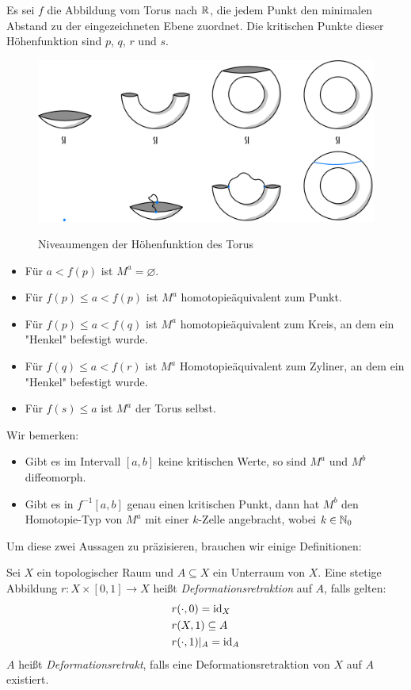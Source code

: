 Es sei $f$ die Abbildung vom Torus nach ${ \mathbb R }$, die jedem Punkt den minimalen
Abstand zu der eingezeichneten Ebene zuordnet. 
Die kritischen Punkte dieser Höhenfunktion sind $p$, $q$, $r$ und $s$.

\begin{figure}[H]
    \centering
    \includegraphics[width=0.8\linewidth]{resources/Me-Diagram3-torus-example.jpeg}
    \label{fig:me-diagram3}
    \caption{Niveaumengen der Höhenfunktion des Torus}
\end{figure}

\begin{itemize}
    \item Für $a < f(p)$ ist $M^a = \varnothing$.
    \item Für $f(p) \leq a < f(p)$ ist $M^a$ homotopieäquivalent zum Punkt.
    \item Für $f(p) \leq a < f(q)$ ist $M^a$ homotopieäquivalent zum Kreis,
        an dem ein "Henkel" befestigt wurde.
    \item Für $f(q) \leq a < f(r)$ ist $M^a$ Homotopieäquivalent zum Zyliner,
        an dem ein "Henkel" befestigt wurde.
    \item Für $f(s) \leq a$ ist $M^a$ der Torus selbst.
\end{itemize}

Wir bemerken: 
\begin{itemize}
    \item Gibt es im Intervall $[a, b]$ keine kritischen Werte, so sind $M^a$ und
        $M^b$ diffeomorph.
    \item Gibt es in $f^{-1}[a, b]$ genau einen kritischen Punkt, dann hat $M^b$ 
        den Homotopie-Typ von $M^a$ mit einer $k$-Zelle angebracht, wobei 
        $k \in { \mathbb N }_0$
\end{itemize}

Um diese zwei Aussagen zu präzisieren, brauchen wir einige Definitionen:

\begin{definition}[Deformationsretrakt]
    Sei $X$ ein topologischer Raum und $A \subseteq X$ ein Unterraum von $X$.
    Eine stetige Abbildung $r: X \times [0, 1] \rightarrow X$ heißt 
    \textit{Deformationsretraktion} auf $A$, falls gelten:
    \begin{align*}
        & r(\cdot, 0) = { \operatorname{id} }_X \\
        & r(X, 1) \subseteq A \\
        & r(\cdot, 1)|_A = { \operatorname{id} }_A \\
    \end{align*}
    $A$ heißt \textit{Deformationsretrakt}, falls eine Deformationsretraktion
    von $X$ auf $A$ existiert.
\end{definition}

